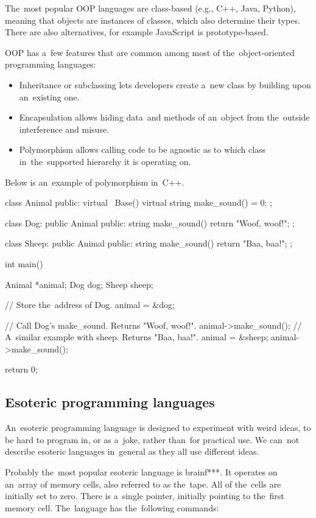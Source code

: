 The~most popular OOP languages are class-based (e.g., C++, Java, Python), meaning that objects are instances of classes, which also determine their types.
There are also alternatives, for example JavaScript is prototype-based.

OOP has a~few features that are common among most of the~object-oriented programming languages:
\begin{itemize}
    \item Inheritance or subclassing lets developers create a~new class by building upon an~existing one.
    \item Encapsulation allows hiding data~and methods of an~object from the~outside interference and misuse.
    \item Polymorphism allows calling code to be agnostic as to which class in~the~supported hierarchy it is operating on.
\end{itemize}

Below is an~example of polymorphism in~C++.
\begin{code}
class Animal {
public:
    virtual ~Base() { }
    virtual string make_sound() = 0;
};

class Dog: public Animal {
public:
    string make_sound() { 
        return "Woof, woof!"; 
    }
};

class Sheep: public Animal {
public:
    string make_sound() { 
        return "Baa, baa!"; 
    }
};

int main() {
    Animal *animal;
    Dog dog;
    Sheep sheep;

    // Store the~address of Dog.
    animal = &dog;

    // Call Dog's make_sound. Returns "Woof, woof!".
    animal->make_sound();
    // A~similar example with sheep. Returns "Baa, baa!".
    animal = &sheep;
    animal->make_sound();

    return 0;
}
\end{code}

\subsection{Esoteric programming languages}
An~esoteric programming language is designed to experiment with weird ideas, to be hard to program in, or as a~joke, rather than~for practical use. We can~not
describe esoteric languages in~general as they all use different ideas.

Probably the~most popular esoteric language is brainf***. It operates on an~array of memory cells, also referred to as the~tape. All of the~cells are initially
set to zero. There is a~single pointer, initially pointing to the~first memory cell. The~language has the~following commands:

